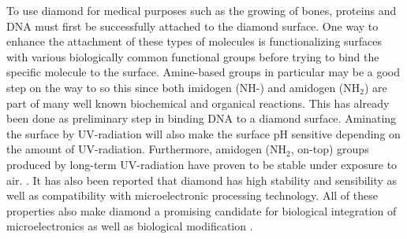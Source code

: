 \documentclass[10pt,a4paper]{article}
\begin{document}
To use diamond for medical purposes such as the growing of bones, proteins and DNA must first be successfully attached to the diamond surface. One way to enhance the attachment of these types of molecules is functionalizing surfaces with various biologically common functional groups before trying to bind the specific molecule to the surface. Amine-based groups in particular may be a good step on the way to so this since both imidogen (NH-) and amidogen (NH$_2$) are part of many well known biochemical and organical reactions. This has already been done as preliminary step in binding DNA to a diamond surface. Aminating the surface by UV-radiation will also make the surface pH sensitive depending on the amount of UV-radiation. Furthermore, amidogen (NH$_2$, on-top) groups produced by long-term UV-radiation have proven to be stable under exposure to air. \cite{kwang-soup.song2006}. It has also been reported that diamond has high stability and sensibility as well as compatibility with microelectronic processing technology. All of these properties also make diamond a promising candidate for  biological integration of microelectronics as well as biological modification \cite{yangwenshaw2002}. 

\end{document}
